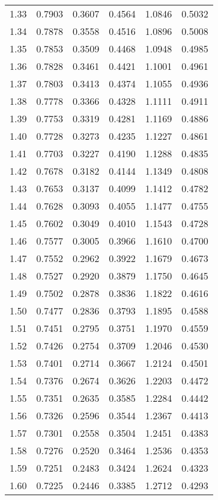\documentclass{article}
\begin{document}
\begin{longtable}{cccccc}
1.33 & 0.7903 & 0.3607 & 0.4564 & 1.0846 & 0.5032 \\
1.34 & 0.7878 & 0.3558 & 0.4516 & 1.0896 & 0.5008 \\
1.35 & 0.7853 & 0.3509 & 0.4468 & 1.0948 & 0.4985 \\
1.36 & 0.7828 & 0.3461 & 0.4421 & 1.1001 & 0.4961 \\
1.37 & 0.7803 & 0.3413 & 0.4374 & 1.1055 & 0.4936 \\
1.38 & 0.7778 & 0.3366 & 0.4328 & 1.1111 & 0.4911 \\
1.39 & 0.7753 & 0.3319 & 0.4281 & 1.1169 & 0.4886 \\
1.40 & 0.7728 & 0.3273 & 0.4235 & 1.1227 & 0.4861 \\
1.41 & 0.7703 & 0.3227 & 0.4190 & 1.1288 & 0.4835 \\
1.42 & 0.7678 & 0.3182 & 0.4144 & 1.1349 & 0.4808 \\
1.43 & 0.7653 & 0.3137 & 0.4099 & 1.1412 & 0.4782 \\
1.44 & 0.7628 & 0.3093 & 0.4055 & 1.1477 & 0.4755 \\
1.45 & 0.7602 & 0.3049 & 0.4010 & 1.1543 & 0.4728 \\
1.46 & 0.7577 & 0.3005 & 0.3966 & 1.1610 & 0.4700 \\
1.47 & 0.7552 & 0.2962 & 0.3922 & 1.1679 & 0.4673 \\
1.48 & 0.7527 & 0.2920 & 0.3879 & 1.1750 & 0.4645 \\
1.49 & 0.7502 & 0.2878 & 0.3836 & 1.1822 & 0.4616 \\
1.50 & 0.7477 & 0.2836 & 0.3793 & 1.1895 & 0.4588 \\
1.51 & 0.7451 & 0.2795 & 0.3751 & 1.1970 & 0.4559 \\
1.52 & 0.7426 & 0.2754 & 0.3709 & 1.2046 & 0.4530 \\
1.53 & 0.7401 & 0.2714 & 0.3667 & 1.2124 & 0.4501 \\
1.54 & 0.7376 & 0.2674 & 0.3626 & 1.2203 & 0.4472 \\
1.55 & 0.7351 & 0.2635 & 0.3585 & 1.2284 & 0.4442 \\
1.56 & 0.7326 & 0.2596 & 0.3544 & 1.2367 & 0.4413 \\
1.57 & 0.7301 & 0.2558 & 0.3504 & 1.2451 & 0.4383 \\
1.58 & 0.7276 & 0.2520 & 0.3464 & 1.2536 & 0.4353 \\
1.59 & 0.7251 & 0.2483 & 0.3424 & 1.2624 & 0.4323 \\
1.60 & 0.7225 & 0.2446 & 0.3385 & 1.2712 & 0.4293 \\

\end{longtable}
\end{document}
